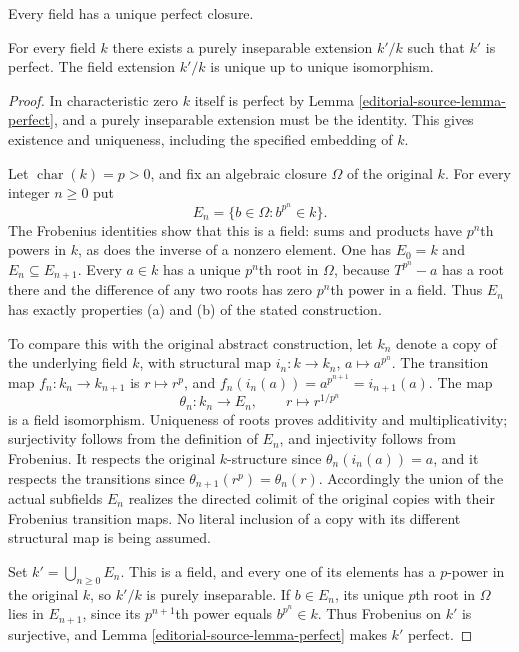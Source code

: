 \begin{lemma}
\label{editorial-source-lemma-perfection}
\begin{slogan}
Every field has a unique perfect closure.
\end{slogan}
For every field $k$ there exists a purely inseparable extension
$k'/k$ such that $k'$ is perfect. The field extension
$k'/k$ is unique up to unique isomorphism.
\end{lemma}

\begin{proof}
In characteristic zero $k$ itself is perfect by
Lemma \ref{editorial-source-lemma-perfect}, and a purely inseparable
extension must be the identity. This gives
existence and uniqueness, including the specified
embedding of $k$.

Let $\operatorname{char}(k)=p>0$, and fix an
algebraic closure $\Omega$ of the original $k$.
For every integer $n\geq0$ put
$$
E_n=\{b\in\Omega:b^{p^n}\in k\}.
$$
The Frobenius identities show that this is a
field: sums and products have $p^n$th powers
in $k$, as does the inverse of a nonzero
element. One has $E_0=k$ and $E_n\subseteq E_{n+1}$.
Every $a\in k$ has a unique $p^n$th root in
$\Omega$, because $T^{p^n}-a$ has a root there
and the difference of any two roots has zero
$p^n$th power in a field. Thus $E_n$ has exactly
properties (a) and (b) of the stated construction.

To compare this with the original abstract
construction, let $k_n$ denote a copy of the
underlying field $k$, with structural map
$i_n:k\to k_n$, $a\mapsto a^{p^n}$.
The transition map $f_n:k_n\to k_{n+1}$ is
$r\mapsto r^p$, and
$f_n(i_n(a))=a^{p^{n+1}}=i_{n+1}(a)$.
The map
$$
\theta_n:k_n\longrightarrow E_n,\qquad
r\longmapsto r^{1/p^n}
$$
is a field isomorphism. Uniqueness of roots
proves additivity and multiplicativity;
surjectivity follows from the definition of
$E_n$, and injectivity follows from Frobenius.
It respects the original $k$-structure since
$\theta_n(i_n(a))=a$, and it respects the
transitions since
$\theta_{n+1}(r^p)=\theta_n(r)$.
Accordingly the union of the actual subfields
$E_n$ realizes the directed colimit of the
original copies with their Frobenius transition
maps. No literal inclusion of a copy with its
different structural map is being assumed.

Set $k'=\bigcup_{n\geq0}E_n$. This is a field,
and every one of its elements has a $p$-power
in the original $k$, so $k'/k$ is purely
inseparable. If $b\in E_n$, its unique $p$th
root in $\Omega$ lies in $E_{n+1}$, since its
$p^{n+1}$th power equals $b^{p^n}\in k$.
Thus Frobenius on $k'$ is surjective, and
Lemma \ref{editorial-source-lemma-perfect} makes $k'$ perfect.


\end{proof}
